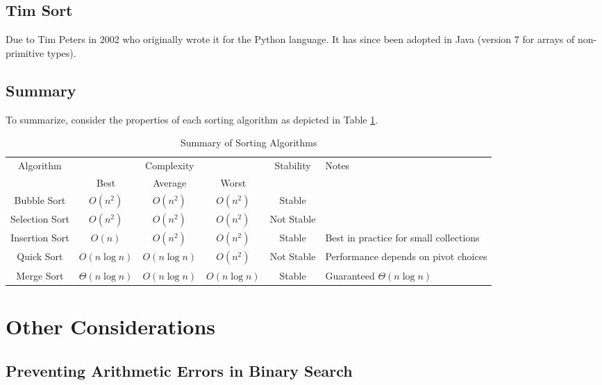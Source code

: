 \subsection{Tim Sort}

Due to Tim Peters in 2002 \cite{Peters2002} who originally wrote it for the Python language.  It has since been adopted 
in Java (version 7 for arrays of non-primitive types).

\subsection{Summary}

To summarize, consider the properties of each sorting algorithm
as depicted in Table \ref{table:sortingSummary}.

\begin{table}[h]
\centering
\begin{tabular}{|c|c|c|c|c|p{3cm}|}
\hline
\multirow{2}{*}{Algorithm} & \multicolumn{3}{|c|}{Complexity} & \multirow{2}{*}{Stability} & \multirow{2}{*}{Notes} \\ \cline{2-4}
~ & Best & Average & Worst & ~ & ~ \\
\hline
Bubble Sort & $O(n^2)$ & $O(n^2)$ & $O(n^2)$ & Stable & \\
\hline
Selection Sort & $O(n^2)$ & $O(n^2)$ & $O(n^2)$ & Not Stable & \\
\hline
Insertion Sort & $O(n)$ & $O(n^2)$ & $O(n^2)$ & Stable & Best in practice for small collections\\
\hline
Quick Sort & $O(n\log{n})$ & $O(n\log{n})$ & $O(n^2)$ & Not Stable & Performance depends on pivot choices\\
\hline
Merge Sort & $\Theta(n\log{n})$ & $O(n\log{n})$ & $O(n\log{n})$ & Stable & Guaranteed $\Theta(n\log{n})$ \\
\hline
\end{tabular}
\caption{Summary of Sorting Algorithms}
\label{table:sortingSummary}
\end{table}

\section{Other Considerations}

\subsection{Preventing Arithmetic Errors in Binary Search}

